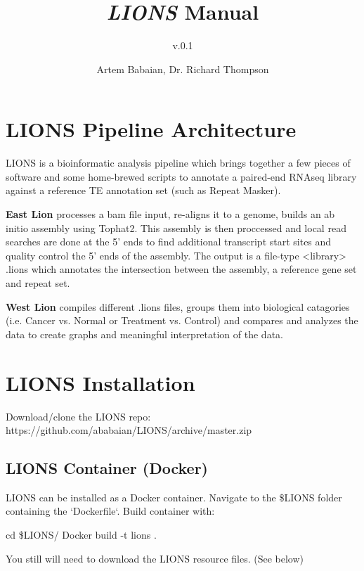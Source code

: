 \documentclass[11pt]{scrartcl}
\title{\textit{LIONS} Manual}
\subtitle{v.0.1}
\author{Artem Babaian, Dr. Richard Thompson}
\newcommand{\arrows}[1]{\textless #1\textgreater}
\begin{document}
\maketitle

\tableofcontents


\section{LIONS Pipeline Architecture}
LIONS is a bioinformatic analysis pipeline which brings together a
 few pieces of software and some home-brewed scripts to annotate a
 paired-end RNAseq library against a reference TE annotation set
 (such as Repeat Masker).

 \textbf{East Lion} processes a bam file input, re-aligns it to a genome,
 builds an ab initio assembly using Tophat2. This assembly is then
 proccessed and local read searches are done at the 5' ends to find
 additional transcript start sites and quality control the 5' ends of
 the assembly. The output is a file-type \arrows{library} .lions which
 annotates the intersection between the assembly, a reference gene set
 and repeat set.

 \textbf{West Lion} compiles different .lions files, groups them into biological
 catagories (i.e. Cancer vs. Normal or Treatment vs. Control) and
 compares and analyzes the data to create graphs and meaningful
 interpretation of the data.

\section{LIONS Installation}

Download/clone the LIONS repo: https://github.com/ababaian/LIONS/archive/master.zip

\subsection{LIONS Container (Docker)}

LIONS can be installed as a Docker container. Navigate to the \$LIONS folder containing the `Dockerfile`. Build container with:

\begin{bash}
cd \$LIONS/
Docker build -t lions .
\end{bash}

You still will need to download the LIONS resource files. (See below)
\end{document}

